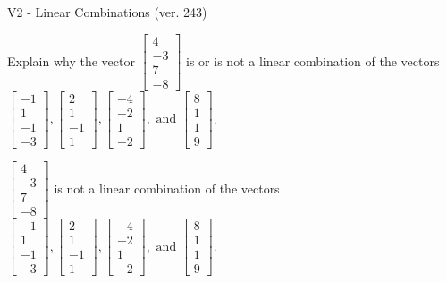 \begin{exercise}
  \begin{exerciseTitle}V2 - Linear Combinations (ver. 243)\end{exerciseTitle}
  \begin{exerciseStatement}
    Explain why the vector \(\left[\begin{array}{c}
4 \\
-3 \\
7 \\
-8
\end{array}\right]\)  is or is not a linear 
	combination of the vectors \(\left[\begin{array}{c}
-1 \\
1 \\
-1 \\
-3
\end{array}\right] , \left[\begin{array}{c}
2 \\
1 \\
-1 \\
1
\end{array}\right] , \left[\begin{array}{c}
-4 \\
-2 \\
1 \\
-2
\end{array}\right] , \text{ and } \left[\begin{array}{c}
8 \\
1 \\
1 \\
9
\end{array}\right]\).
	


  \end{exerciseStatement}
  \begin{exerciseAnswer}
   \(\left[\begin{array}{c}
4 \\
-3 \\
7 \\
-8
\end{array}\right]\) 
  	 is not  
	a linear combination of the vectors \(\left[\begin{array}{c}
-1 \\
1 \\
-1 \\
-3
\end{array}\right] , \left[\begin{array}{c}
2 \\
1 \\
-1 \\
1
\end{array}\right] , \left[\begin{array}{c}
-4 \\
-2 \\
1 \\
-2
\end{array}\right] , \text{ and } \left[\begin{array}{c}
8 \\
1 \\
1 \\
9
\end{array}\right]\).


\end{exerciseAnswer}
\end{exercise}
